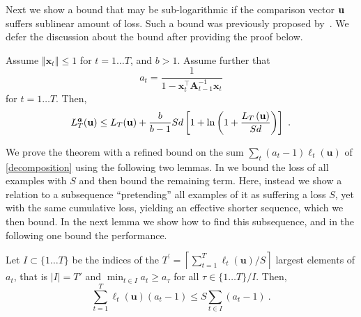 
Next we show a bound that may be sub-logarithmic if the comparison
vector $\mathbf{u}$ suffers sublinear amount of loss. Such a bound was
previously proposed by~\cite{OrabonaCBG12}. We defer the
discussion about the bound after providing the proof below.
\begin{theorem}
\label{thm:theorem4}
Assume $\left\Vert \mathbf{x}_{t}\right\Vert \leq1$ for $t=1 \dots T$,
and $b>1$. Assume further that
\begin{equation}
a_{t}=\frac{1}{1-\mathbf{x}_{t}^{\top}\mathbf{A}_{t-1}^{-1}\mathbf{x}_{t}} \label{at}
\end{equation}
for $t=1 \dots T$.
Then,
\begin{align*}
L_{T}^{\boldsymbol{a}}(\mathbf{u})\leq L_{T}(\mathbf{u})+\frac{b}{b-1}Sd\left[1+\ln\left(1+\frac{L_T\left({\mathbf{u}}\right)}{Sd}\right)\right]~.
\end{align*}
\end{theorem}
We prove the theorem with a refined bound on the sum $\sum_t (a_t-1)
\ell_{t}(\mathbf{u})$ of \eqref{decomposition} using the
following two lemmas.
In
 we bound the loss of all examples with $S$ and
then bound the remaining term. Here, instead we show a relation to a
subsequence ``pretending'' all examples of it as suffering a loss $S$, yet with the same cumulative loss, yielding
an effective shorter sequence, which we then bound. In the next lemma
we show how to find this subsequence, and in the following one bound
the performance.
\begin{lemma}
Let $I\subset \{1 \dots T\}$ be the indices of the $T^{'}=\left\lceil
  \sum_{t=1}^{T}\ell_{t}\left(\mathbf{u}\right)/S\right\rceil$ largest elements of $a_t$,
that is $\vert I \vert = T'$ and $\min_{t \in I} a_t \geq a_\tau$ for
all $\tau \in \{ 1 \dots T\} / I$. Then,
\[
\sum_{t=1}^{T} \ell_{t}\left(\mathbf{u}\right) \left(a_{t}-1\right) \leq
S\sum_{t \in I}\left(a_{t}-1\right) ~.
\]
\label{lem:stacking_examples}
\end{lemma}

